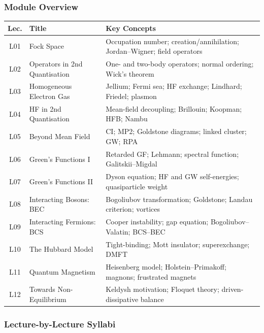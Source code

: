 \documentclass[11pt,a4paper]{article}
\begin{document}
\subsubsection*{Module Overview}
\begin{center}
\begin{tabularx}{\textwidth}{clX}
\toprule
\textbf{Lec.} & \textbf{Title} & \textbf{Key Concepts}\\
\midrule
L01 & Fock Space & Occupation number; creation/annihilation; Jordan--Wigner; field operators\\
L02 & Operators in 2nd Quantisation & One- and two-body operators; normal ordering; Wick's theorem\\
L03 & Homogeneous Electron Gas & Jellium; Fermi sea; HF exchange; Lindhard; Friedel; plasmon\\
L04 & HF in 2nd Quantisation & Mean-field decoupling; Brillouin; Koopman; HFB; Nambu\\
L05 & Beyond Mean Field & CI; MP2; Goldstone diagrams; linked cluster; GW; RPA\\
L06 & Green's Functions I & Retarded GF; Lehmann; spectral function; Galitskii--Migdal\\
L07 & Green's Functions II & Dyson equation; HF and GW self-energies; quasiparticle weight\\
L08 & Interacting Bosons: BEC & Bogoliubov transformation; Goldstone; Landau criterion; vortices\\
L09 & Interacting Fermions: BCS & Cooper instability; gap equation; Bogoliubov--Valatin; BCS--BEC\\
L10 & The Hubbard Model & Tight-binding; Mott insulator; superexchange; DMFT\\
L11 & Quantum Magnetism & Heisenberg model; Holstein--Primakoff; magnons; frustrated magnets\\
L12 & Towards Non-Equilibrium & Keldysh motivation; Floquet theory; driven-dissipative balance\\
\bottomrule
\end{tabularx}
\end{center}

\subsubsection*{Lecture-by-Lecture Syllabi}
\end{document}
